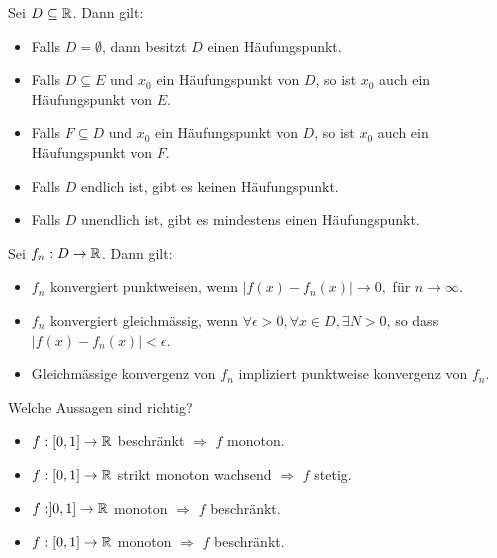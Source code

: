 Sei $D \subseteq \mathbb{R}$. Dann gilt:
\begin{itemize}
    \item[$\square$]
    Falls $D = \emptyset$, dann besitzt $D$ einen Häufungspunkt.
    \item[\rlap{\raisebox{0.3ex}{\hspace{0.4ex}\tiny \ding{52}}}$\square$]
    Falls $D \subseteq E$ und $x_0$ ein Häufungspunkt von $D$, so ist $x_0$ auch ein Häufungspunkt von $E$.
    \item[$\square$]
    Falls $F \subseteq D$ und $x_0$ ein Häufungspunkt von $D$, so ist $x_0$ auch ein Häufungspunkt von $F$.
    \item[\rlap{\raisebox{0.3ex}{\hspace{0.4ex}\tiny \ding{52}}}$\square$]
    Falls $D$ endlich ist, gibt es keinen Häufungspunkt.
    \item[$\square$]
    Falls $D$ unendlich ist, gibt es mindestens einen Häufungspunkt.
\end{itemize}

Sei $f_n : D \to \mathbb{R}$. Dann gilt:
\begin{itemize}
    \item[\rlap{\raisebox{0.3ex}{\hspace{0.4ex}\tiny \ding{52}}}$\square$]
    $f_n$ konvergiert punktweisen, wenn $|f(x) - f_n(x)| \to 0,$ für $n \to \infty$.
    \item[$\square$]
    $f_n$ konvergiert gleichmässig, wenn $\forall \epsilon > 0, \forall x \in D, \exists N > 0$, so dass $|f(x) - f_n(x)| < \epsilon$.
    \item[\rlap{\raisebox{0.3ex}{\hspace{0.4ex}\tiny \ding{52}}}$\square$]
    Gleichmässige konvergenz von $f_n$ impliziert punktweise konvergenz von $f_n$.
\end{itemize}

Welche Aussagen sind richtig?
\begin{itemize}
    \item[$\square$]
    $f : [0,1] \to \mathbb{R}$ beschränkt $\Rightarrow$ $f$ monoton.
    \item[$\square$]
    $f : [0,1] \to \mathbb{R}$ strikt monoton wachsend $\Rightarrow$ $f$ stetig.
    \item[$\square$]
    $f : ]0,1] \to \mathbb{R}$ monoton $\Rightarrow$ $f$ beschränkt.
    \item[\rlap{\raisebox{0.3ex}{\hspace{0.4ex}\tiny \ding{52}}}$\square$]
    $f : [0,1] \to \mathbb{R}$ monoton $\Rightarrow$ $f$ beschränkt.
\end{itemize}

